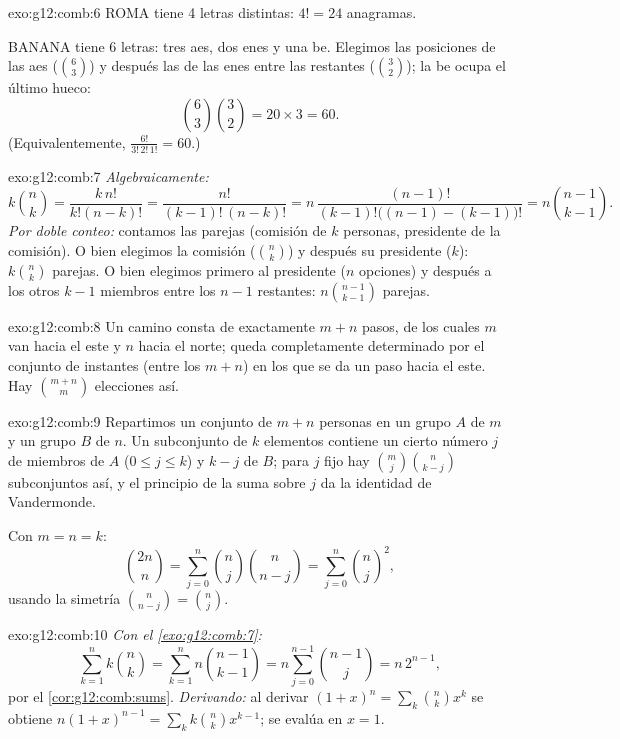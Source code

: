\begin{solution}{exo:g12:comb:6}
ROMA tiene 4 letras distintas: $4! = 24$ anagramas.

BANANA tiene 6 letras: tres aes, dos enes y una be. Elegimos las posiciones
de las aes ($\binom63$) y después las de las enes entre las restantes
($\binom32$); la be ocupa el último hueco:
\[
\binom{6}{3}\binom{3}{2} = 20 \times 3 = 60 .
\]
(Equivalentemente, $\frac{6!}{3!\,2!\,1!} = 60$.)
\end{solution}

\begin{solution}{exo:g12:comb:7}
\emph{Algebraicamente:}
\[
k\binom nk = \frac{k\,n!}{k!(n-k)!} = \frac{n!}{(k-1)!\,(n-k)!}
= n\,\frac{(n-1)!}{(k-1)!\bigl((n-1)-(k-1)\bigr)!} = n\binom{n-1}{k-1}.
\]
\emph{Por doble conteo:} contamos las parejas (comisión de $k$ personas,
presidente de la comisión). O bien elegimos la comisión ($\binom nk$) y
después su presidente ($k$): $k\binom nk$ parejas. O bien elegimos primero
al presidente ($n$ opciones) y después a los otros $k-1$ miembros entre los
$n-1$ restantes: $n\binom{n-1}{k-1}$ parejas.
\end{solution}

\begin{solution}{exo:g12:comb:8}
Un camino consta de exactamente $m + n$ pasos, de los cuales $m$ van hacia
el este y $n$ hacia el norte; queda completamente determinado por el
conjunto de instantes (entre los $m+n$) en los que se da un paso hacia el
este. Hay $\binom{m+n}{m}$ elecciones así.
\end{solution}

\begin{solution}{exo:g12:comb:9}
Repartimos un conjunto de $m + n$ personas en un grupo $A$ de $m$ y un
grupo $B$ de $n$. Un subconjunto de $k$ elementos contiene un cierto número
$j$ de miembros de $A$ ($0 \leq j \leq k$) y $k - j$ de $B$; para $j$ fijo
hay $\binom mj \binom{n}{k-j}$ subconjuntos así, y el principio de la suma
sobre $j$ da la identidad de Vandermonde.

Con $m = n = k$:
\[
\binom{2n}{n} = \sum_{j=0}^n \binom nj \binom{n}{n-j}
= \sum_{j=0}^n \binom nj^{2},
\]
usando la simetría $\binom{n}{n-j} = \binom nj$.
\end{solution}

\begin{solution}{exo:g12:comb:10}
\emph{Con el \cref{exo:g12:comb:7}:}
\[
\sum_{k=1}^n k\binom nk = \sum_{k=1}^n n\binom{n-1}{k-1}
= n\sum_{j=0}^{n-1}\binom{n-1}{j} = n\,2^{n-1},
\]
por el \cref{cor:g12:comb:sums}. \emph{Derivando:} al derivar
$(1+x)^n = \sum_k \binom nk x^k$ se obtiene
$n(1+x)^{n-1} = \sum_k k \binom nk x^{k-1}$; se evalúa en $x = 1$.
\end{solution}

